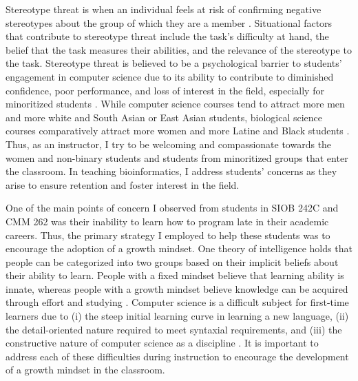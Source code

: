 Stereotype threat is when an individual feels at risk of confirming negative stereotypes about the group of which they are a member \cite{steele2002,thoman2013,smith2008,eschenbach2014,bell2003}. Situational factors that contribute to stereotype threat include the task's difficulty at hand, the belief that the task measures their abilities, and the relevance of the stereotype to the task. Stereotype threat is believed to be a psychological barrier to students' engagement in computer science due to its ability to contribute to diminished confidence, poor performance, and loss of interest in the field, especially for minoritized students \cite{steele2002,smith2008,eschenbach2014,bell2003,kumar2012,halljr.2018,falkner2015}. While computer science courses tend to attract more men and more white and South Asian or East Asian students, biological science courses comparatively attract more women and more Latine and Black students \cite{nationalcenterforscienceandengineeringstatisticsncses2019,falkner2015,halljr.2018,bell2003}. Thus, as an instructor, I try to be welcoming and compassionate towards the women and non-binary students and students from minoritized groups that enter the classroom. In teaching bioinformatics, I address students' concerns as they arise to ensure retention and foster interest in the field.

One of the main points of concern I observed from students in SIOB 242C and CMM 262 was their inability to learn how to program late in their academic careers. Thus, the primary strategy I employed to help these students was to encourage the adoption of a growth mindset. One theory of intelligence holds that people can be categorized into two groups based on their implicit beliefs about their ability to learn. People with a fixed mindset believe that learning ability is innate, whereas people with a growth mindset believe knowledge can be acquired through effort and studying \cite{hochanadel2015,rhew2018,morreale2021,stout2017}. Computer science is a difficult subject for first-time learners due to (i) the steep initial learning curve in learning a new language, (ii) the detail-oriented nature required to meet syntaxial requirements, and (iii) the constructive nature of computer science as a discipline \cite{rivers2016,parker2014,qian2017}. It is important to address each of these difficulties during instruction to encourage the development of a growth mindset in the classroom. 

